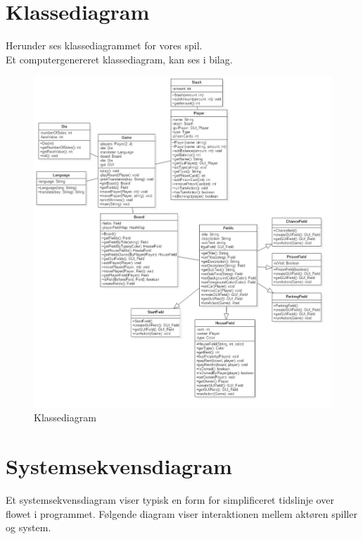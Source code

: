 \section{Klassediagram}

Herunder ses klassediagrammet for vores spil. \\
Et computergenereret klassediagram, kan ses i bilag.

\begin{figure}[H]
    \begin{center}
        \includegraphics[width=16cm]{graphics/FinalClassDiagram.png}
        \caption{Klassediagram}
        \label{fig:Class_diagram}
    \end{center}
\end{figure}

\pagebreak

\section{Systemsekvensdiagram}
Et systemsekvensdiagram viser typisk en form for simplificeret tidslinje over flowet i programmet. Følgende diagram viser interaktionen mellem aktøren spiller og system.

